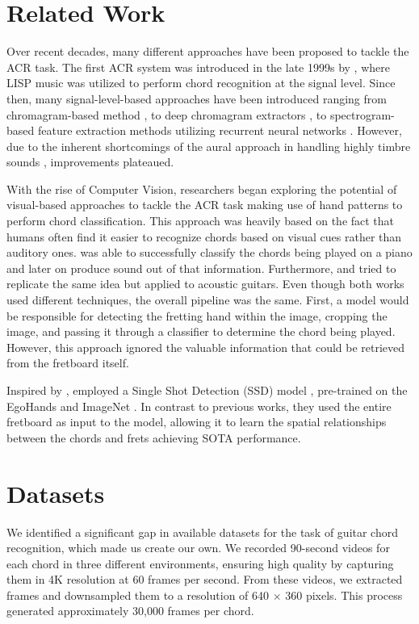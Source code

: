 \documentclass[10pt,twocolumn,letterpaper]{article}
\begin{document}
\section{Related Work}  
Over recent decades, many different approaches have been proposed to tackle the ACR task. The first ACR system was introduced in the late 1999s by \cite{takuya1999realtime}, where LISP music was utilized to perform chord recognition at the signal level. Since then, many signal-level-based approaches have been introduced ranging from chromagram-based method \cite{stark2009real}, to deep chromagram extractors \cite{korzeniowski2016feature}, to spectrogram-based feature extraction methods utilizing recurrent neural networks \cite{boulanger2013audio}. However, due to the inherent shortcomings of the aural approach in handling highly timbre sounds \cite{du2023conditional}, improvements plateaued. 

With the rise of Computer Vision, researchers began exploring the potential of visual-based approaches to tackle the ACR task making use of hand patterns to perform chord classification. This approach was heavily based on the fact that humans often find it easier to recognize chords based on visual cues rather than auditory ones. \cite{su2020audeo} was able to successfully classify the chords being played on a piano and later on produce sound out of that information. Furthermore, \cite{tran2019cnn} and \cite{ooaku2018guitar} tried to replicate the same idea but applied to acoustic guitars. Even though both works used different techniques, the overall pipeline was the same. First, a model would be responsible for detecting the fretting hand within the image, cropping the image, and passing it through a classifier to determine the chord being played. However, this approach ignored the valuable information that could be retrieved from the fretboard itself.

Inspired by \cite{tran2019cnn, ooaku2018guitar}, \cite{Kristian_Zaman_Tenoyo_Jodhinata_2024} employed a Single Shot Detection (SSD) model \cite{sandler2018mobilenetv2}, pre-trained on the EgoHands \cite{Bambach_2015_ICCV} and ImageNet \cite{deng2009imagenet}. In contrast to previous works, they used the entire fretboard as input to the model, allowing it to learn the spatial relationships between the chords and frets achieving SOTA performance.

\section{Datasets}
We identified a significant gap in available datasets for the task of guitar chord recognition, which made us create our own. We recorded 90-second videos for each chord in three different environments, ensuring high quality by capturing them in 4K resolution at 60 frames per second. From these videos, we extracted frames and downsampled them to a resolution of 640 $\times$ 360 pixels. This process generated approximately 30,000 frames per chord.
\end{document}
